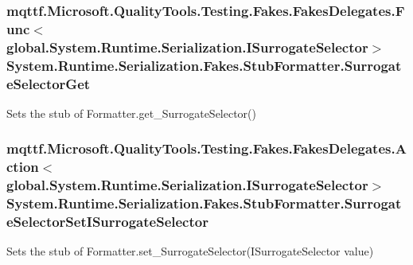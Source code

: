 \hypertarget{class_system_1_1_runtime_1_1_serialization_1_1_fakes_1_1_stub_formatter_adf271fea026cd86c67cd83ef2d343ee1}{
\subsubsection[{Surrogate\-Selector\-Get}]{\setlength{\rightskip}{0pt plus 5cm}mqttf.\-Microsoft.\-Quality\-Tools.\-Testing.\-Fakes.\-Fakes\-Delegates.\-Func$<$global.\-System.\-Runtime.\-Serialization.\-I\-Surrogate\-Selector$>$ System.\-Runtime.\-Serialization.\-Fakes.\-Stub\-Formatter.\-Surrogate\-Selector\-Get}}\label{class_system_1_1_runtime_1_1_serialization_1_1_fakes_1_1_stub_formatter_adf271fea026cd86c67cd83ef2d343ee1}


Sets the stub of Formatter.\-get\-\_\-\-Surrogate\-Selector()

\hypertarget{class_system_1_1_runtime_1_1_serialization_1_1_fakes_1_1_stub_formatter_afff8ca9d8e009291acdae2c9af65cd5a}{
\subsubsection[{Surrogate\-Selector\-Set\-I\-Surrogate\-Selector}]{\setlength{\rightskip}{0pt plus 5cm}mqttf.\-Microsoft.\-Quality\-Tools.\-Testing.\-Fakes.\-Fakes\-Delegates.\-Action$<$global.\-System.\-Runtime.\-Serialization.\-I\-Surrogate\-Selector$>$ System.\-Runtime.\-Serialization.\-Fakes.\-Stub\-Formatter.\-Surrogate\-Selector\-Set\-I\-Surrogate\-Selector}}\label{class_system_1_1_runtime_1_1_serialization_1_1_fakes_1_1_stub_formatter_afff8ca9d8e009291acdae2c9af65cd5a}


Sets the stub of Formatter.\-set\-\_\-\-Surrogate\-Selector(\-I\-Surrogate\-Selector value)

